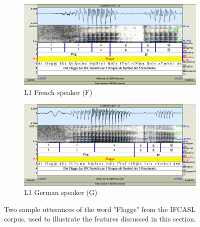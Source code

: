 	\begin{figure}
		\centering
		\begin{subfigure}[t]{\textwidth}
                \includegraphics[width=\textwidth]{img/screenshots/2SH05_FGMB1_527-flagge}
                \caption{L1 French speaker (F)}
                \label{fig:featuresexample:fg}
        \end{subfigure}%
        \vspace{1.5em}
                \vspace{1.5em}

        \begin{subfigure}[b]{\textwidth}
                \includegraphics[width=\textwidth]{img/screenshots/2SH05_GGMB2_035-flagge}
                \caption{L1 German speaker (G)}
                \label{fig:featuresexample:gg}
        \end{subfigure}%
		\caption{Two sample utterances of the word "Flagge" from the IFCASL corpus, used to illustrate the features discussed in this section. }
		\label{fig:featuresexample}
	\end{figure}
	
